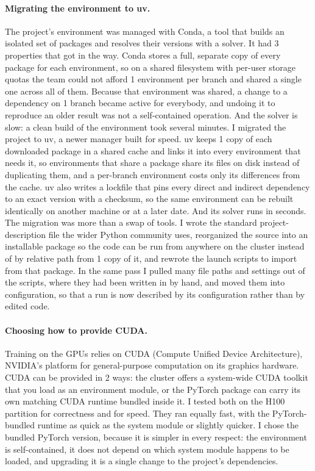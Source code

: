 \documentclass[12pt,a4paper]{article}
\begin{document}
\paragraph{Migrating the environment to uv.} The project's environment was managed with Conda, a
tool that builds an isolated set of packages and resolves their versions with a solver. It had 3 properties that got in the way. Conda stores a full, separate copy of every package for each
environment, so on a shared filesystem with per-user storage quotas the team could not afford 1
environment per branch and shared a single one across all of them. Because that environment was
shared, a change to a dependency on 1 branch became active for everybody, and undoing it to
reproduce an older result was not a self-contained operation. And the solver is slow: a clean
build of the environment took several minutes. I migrated the project to uv, a newer manager built
for speed. uv keeps 1 copy of each downloaded package in a shared cache and links it into every
environment that needs it, so environments that share a package share its files on disk instead of
duplicating them, and a per-branch environment costs only its differences from the cache. uv also
writes a lockfile that pins every direct and indirect dependency to an exact version with a
checksum, so the same environment can be rebuilt identically on another machine or at a later date.
And its solver runs in seconds. The migration was more than a swap of tools. I wrote the standard
project-description file the wider Python community uses, reorganized the source into an installable
package so the code can be run from anywhere on the cluster instead of by relative path from 1 copy
of it, and rewrote the launch scripts to import from that package. In the same pass I pulled many
file paths and settings out of the scripts, where they had been written in by hand, and moved them
into configuration, so that a run is now described by its configuration rather than by edited code.

\paragraph{Choosing how to provide CUDA.} Training on the GPUs relies on CUDA (Compute Unified
Device Architecture), NVIDIA's platform for general-purpose computation on its graphics hardware.
CUDA can be provided in 2 ways: the cluster offers a system-wide CUDA toolkit that you load as an
environment module, or the PyTorch package can carry its own matching CUDA runtime bundled inside
it. I tested both on the H100 partition for correctness and for speed. They ran equally fast, with
the PyTorch-bundled runtime as quick as the system module or slightly quicker. I chose the bundled
PyTorch version, because it is simpler in every respect: the environment is self-contained, it does
not depend on which system module happens to be loaded, and upgrading it is a single change to the
project's dependencies.
\end{document}
